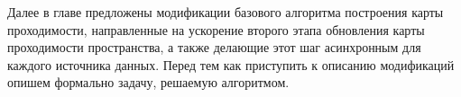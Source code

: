 Далее в главе предложены модификации базового алгоритма построения карты проходимости, направленные на ускорение второго этапа обновления карты проходимости пространства, а также делающие этот шаг асинхронным для каждого источника данных. Перед тем как приступить к описанию модификаций опишем формально задачу, решаемую алгоритмом.





